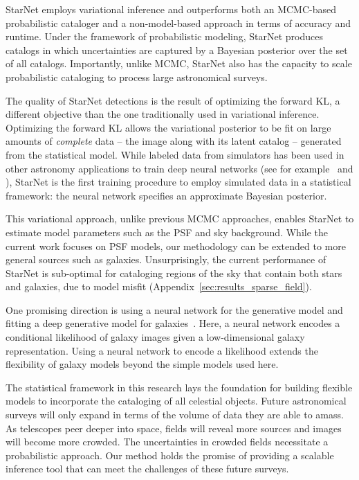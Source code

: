 StarNet employs variational inference and outperforms both an MCMC-based probabilistic cataloger and a non-model-based approach in terms of accuracy and runtime. 
Under the framework of probabilistic modeling, 
StarNet produces catalogs in which uncertainties are captured by a Bayesian posterior over the set of all catalogs.
Importantly, unlike MCMC, StarNet also has the capacity to scale probabilistic cataloging to process large astronomical surveys. 

The quality of StarNet detections is the result of optimizing the forward KL, a different objective than the one traditionally used in variational inference. 
Optimizing the forward KL allows the variational posterior to be fit on large amounts of {\itshape complete} data -- the image along with its latent catalog -- generated from the statistical model. 
While labeled data from simulators has been used in other astronomy applications to train deep neural networks (see for example~\cite{Lanusse_2017_cmudeeplens} and \cite{huang2019finding}), StarNet is the first training procedure to employ simulated data in a statistical framework: the neural network specifies an approximate Bayesian posterior. 

This variational approach, unlike previous MCMC approaches, enables StarNet to estimate model parameters such as the PSF and sky background.
While the current work focuses on PSF models, our methodology can be extended to more general sources such as galaxies. 
Unsurprisingly, the current performance of StarNet is sub-optimal for cataloging regions of the sky that contain both stars and galaxies, due to model misfit (Appendix~\ref{sec:results_sparse_field}).  

One promising direction is using a neural network for the generative model and fitting a deep generative model for galaxies~\citep{Regier2015ADG, Reiman_2019_gans_deblend, lanusse2020deep, Arcelin_2020}. 
Here, a neural network encodes a conditional likelihood of galaxy images given a low-dimensional galaxy representation. 
Using a neural network to encode a likelihood extends the flexibility of galaxy models beyond the simple models used here. 


The statistical framework in this research lays the foundation for building flexible models to incorporate the cataloging of all celestial objects. 
Future astronomical surveys will only expand in terms of the volume of data they are able to amass. 
As telescopes peer deeper into space, fields will reveal more sources and images will become more crowded. 
The uncertainties in crowded fields necessitate a probabilistic approach. 
Our method holds the promise of providing  a scalable inference tool that can meet the challenges of these future surveys. 


